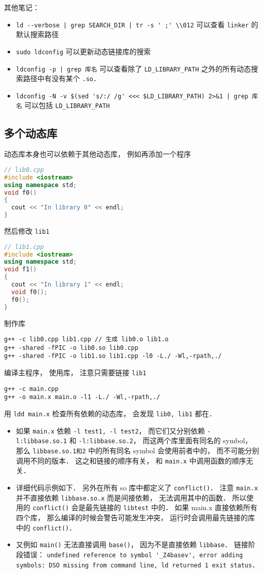 其他笔记：
\begin{itemize}
\item \verb`ld --verbose | grep SEARCH_DIR | tr -s ' ;' \\012` 可以查看 \verb|linker| 的默认搜索路径
\item \verb|sudo ldconfig| 可以更新动态链接库的搜索
\item \verb`ldconfig -p | grep 库名` 可以查看除了 \verb|LD_LIBRARY_PATH| 之外的所有动态搜索路径中有没有某个 \verb|.so|．
\item \verb`ldconfig -N -v $(sed 's/:/ /g' <<< $LD_LIBRARY_PATH) 2>&1 | grep 库名` 可以包括 \verb|LD_LIBRARY_PATH|
\end{itemize}

\subsection{多个动态库}
动态库本身也可以依赖于其他动态库， 例如再添加一个程序
\begin{lstlisting}[language=cpp]
// lib0.cpp
#include <iostream>
using namespace std;
void f0()
{
  cout << "In library 0" << endl;
}
\end{lstlisting}
然后修改 \verb|lib1|
\begin{lstlisting}[language=cpp]
// lib1.cpp
#include <iostream>
using namespace std;
void f1()
{
  cout << "In library 1" << endl;
  void f0();
  f0();
}
\end{lstlisting}
制作库
\begin{lstlisting}[language=none]
g++ -c lib0.cpp lib1.cpp // 生成 lib0.o lib1.o
g++ -shared -fPIC -o lib0.so lib0.cpp
g++ -shared -fPIC -o lib1.so lib1.cpp -l0 -L./ -Wl,-rpath,./
\end{lstlisting}
编译主程序， 使用库， 注意只需要链接 \verb|lib1|
\begin{lstlisting}[language=none]
g++ -c main.cpp
g++ -o main.x main.o -l1 -L./ -Wl,-rpath,./
\end{lstlisting}
用 \verb|ldd main.x| 检查所有依赖的动态库， 会发现 \verb|lib0, lib1| 都在．

\begin{itemize}
\item 如果 \verb|main.x| 依赖 \verb|-l test1, -l test2|， 而它们又分别依赖 \verb|-l:libbase.so.1| 和 \verb|-l:libbase.so.2|， 而这两个库里面有同名的 symbol， 那么 \verb|libbase.so.1和2| 中的所有同名 symbol 会使用前者中的， 而不可能分别调用不同的版本． 这之和链接的顺序有关， 和 \verb|main.x| 中调用函数的顺序无关．
\item 详细代码示例如下． 另外在所有 so 库中都定义了 \verb|conflict()|． 注意 \verb|main.x| 并不直接依赖 \verb|libbase.so.x| 而是间接依赖， 无法调用其中的函数． 所以使用的 \verb|conflict()| 会是最先链接的 \verb|libtest| 中的． 如果 main.x 直接依赖所有四个库， 那么编译的时候会警告可能发生冲突， 运行时会调用最先链接的库中的 \verb|conflict()|．
\item 又例如 \verb|main()| 无法直接调用 \verb|base()|， 因为不是直接依赖 \verb|libbase|． 链接阶段错误： \verb|undefined reference to symbol '_Z4basev', error adding symbols: DSO missing from command line, ld returned 1 exit status|．
\end{itemize}

